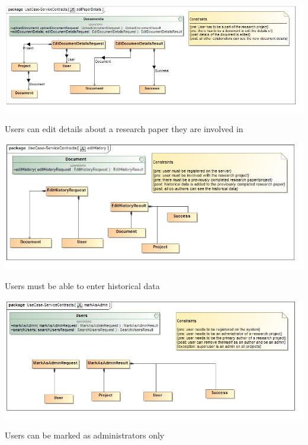 \documentclass[a4paper,12pt]{report}
\begin{document}
\newpage

\begin{flushleft}
	\includegraphics[scale=0.5]{./images/class__editPaperDetails.jpg}
	\begin{center}
		Users can edit details about a research paper they are involved in
	\end{center}
\end{flushleft}

\begin{flushleft}
	\includegraphics[scale=0.5]{./images/class__editHistory.jpg}
	\begin{center}
		Users must be able to enter historical data
	\end{center}
\end{flushleft}

\newpage

\begin{flushleft}
	\includegraphics[scale=0.5]{./images/class__markAsAdmin.jpg}
	\begin{center}
		Users can be marked as administrators only
	\end{center}
\end{flushleft}
\end{document}
